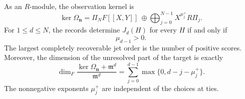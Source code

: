 \begin{theorem}
\label{thm:unequal-kernel}
As an $R$-module, the observation kernel is
\begin{equation}
 \ker\Omega_{\boldsymbol n}
 =\Pi_N F[[X,Y]]\ \oplus\!
   \bigoplus_{j=0}^{N-1}X^{\mu_j^+}R\Pi_j.
 \label{eq:unequal-kernel}
\end{equation}
For $1\le d\le N$, the records determine $J_d(H)$ for every $H$ if and only if
\begin{equation}
 \mu_{d-1}>0.
 \label{eq:unequal-clean}
\end{equation}
The largest completely recoverable jet order is the number of positive scores.
Moreover, the dimension of the unresolved part of the target is exactly
\begin{equation}
 \dim_F\frac{\ker\Omega_{\boldsymbol n}+\mathfrak m^d}{\mathfrak m^d}
 =\sum_{j=0}^{d-1}\max\{0,d-j-\mu_j^+\}.
 \label{eq:unequal-dimension}
\end{equation}
The nonnegative exponents $\mu_j^+$ are independent of the choices at ties.
\end{theorem}

